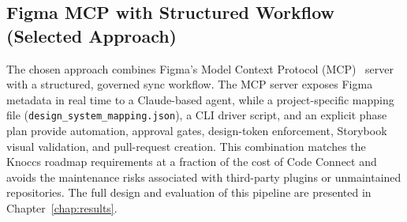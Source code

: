 \subsection{Figma MCP with Structured Workflow (Selected Approach)}
The chosen approach combines Figma's Model Context Protocol (MCP)~\cite{mcp} server with a structured, governed sync workflow. The MCP server exposes Figma metadata in real time to a Claude-based agent, while a project-specific mapping file (\texttt{design\_system\_mapping.json}), a CLI driver script, and an explicit phase plan provide automation, approval gates, design-token enforcement, Storybook visual validation, and pull-request creation. This combination matches the Knoccs roadmap requirements at a fraction of the cost of Code Connect and avoids the maintenance risks associated with third-party plugins or unmaintained repositories. The full design and evaluation of this pipeline are presented in Chapter~\ref{chap:results}.

